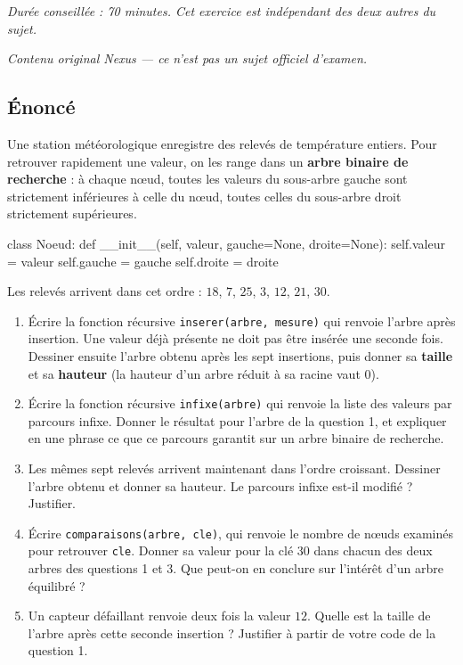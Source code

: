 \textit{Durée conseillée : 70 minutes. Cet exercice est indépendant des deux
autres du sujet.}

\medskip
\textit{Contenu original Nexus --- ce n'est pas un sujet officiel d'examen.}

\subsection*{Énoncé}

Une station météorologique enregistre des relevés de température entiers. Pour
retrouver rapidement une valeur, on les range dans un \textbf{arbre binaire de
recherche} : à chaque nœud, toutes les valeurs du sous-arbre gauche sont
strictement inférieures à celle du nœud, toutes celles du sous-arbre droit
strictement supérieures.

\begin{python}
class Noeud:
    def __init__(self, valeur, gauche=None, droite=None):
        self.valeur = valeur
        self.gauche = gauche
        self.droite = droite
\end{python}

Les relevés arrivent dans cet ordre : $18$, $7$, $25$, $3$, $12$, $21$, $30$.

\begin{enumerate}
  \item Écrire la fonction récursive \lstinline{inserer(arbre, mesure)} qui
    renvoie l'arbre après insertion. Une valeur déjà présente ne doit pas être
    insérée une seconde fois. Dessiner ensuite l'arbre obtenu après les sept
    insertions, puis donner sa \textbf{taille} et sa \textbf{hauteur} (la
    hauteur d'un arbre réduit à sa racine vaut $0$).

  \item Écrire la fonction récursive \lstinline{infixe(arbre)} qui renvoie la
    liste des valeurs par parcours infixe. Donner le résultat pour l'arbre de
    la question 1, et expliquer en une phrase ce que ce parcours garantit sur
    un arbre binaire de recherche.

  \item Les mêmes sept relevés arrivent maintenant dans l'ordre croissant.
    Dessiner l'arbre obtenu et donner sa hauteur. Le parcours infixe est-il
    modifié ? Justifier.

  \item Écrire \lstinline{comparaisons(arbre, cle)}, qui renvoie le nombre de
    nœuds examinés pour retrouver \lstinline{cle}. Donner sa valeur pour la clé
    $30$ dans chacun des deux arbres des questions 1 et 3. Que peut-on en
    conclure sur l'intérêt d'un arbre équilibré ?

  \item Un capteur défaillant renvoie deux fois la valeur $12$. Quelle est la
    taille de l'arbre après cette seconde insertion ? Justifier à partir de
    votre code de la question 1.
\end{enumerate}

